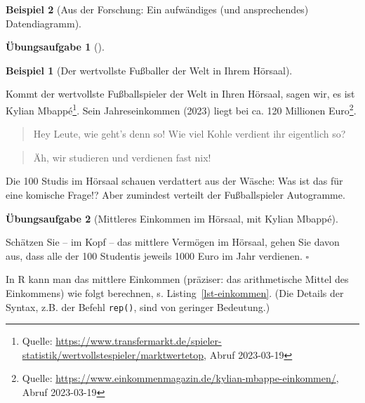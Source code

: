 \documentclass[
  a4paper,
]{scrbook}
\theoremstyle{definition}
\newtheorem{example}{Beispiel}[chapter]
\theoremstyle{definition}
\theoremstyle{definition}
\newtheorem{exercise}{Übungsaufgabe}[chapter]
\theoremstyle{remark}
\begin{document}
\begin{example}[Aus der Forschung: Ein aufwändiges (und ansprechendes)
Datendiagramm]
\begin{exercise}[]
\end{exercise}

\begin{example}[Der wertvollste Fußballer der Welt in Ihrem
Hörsaal]\protect\hypertarget{exm-md}{}\label{exm-md}

Kommt der wertvollste Fußballspieler der Welt in Ihren Hörsaal, sagen
wir, es ist Kylian Mbappé\footnote{Quelle:
  \url{https://www.transfermarkt.de/spieler-statistik/wertvollstespieler/marktwertetop},
  Abruf 2023-03-19}. Sein Jahreseinkommen (2023) liegt bei ca. 120
Millionen Euro\footnote{Quelle:
  \url{https://www.einkommenmagazin.de/kylian-mbappe-einkommen/}, Abruf
  2023-03-19}.

\begin{quote}
{} Hey Leute, wie geht's denn so! Wie viel Kohle
verdient ihr eigentlich so?
\end{quote}

\begin{quote}
{} Äh, wir studieren und verdienen fast nix!
\end{quote}

Die 100 Studis im Hörsaal schauen verdattert aus der Wäsche: Was ist das
für eine komische Frage!? Aber zumindest verteilt der Fußballspieler
Autogramme.

\end{example}

\begin{exercise}[Mittleres Einkommen im Hörsaal, mit Kylian
Mbappé]\protect\hypertarget{exr-elon}{}\label{exr-elon}

Schätzen Sie -- im Kopf -- das mittlere Vermögen im Hörsaal, gehen Sie
davon aus, dass alle der 100 Studentis jeweils 1000 Euro im Jahr
verdienen. \(\square\)

\end{exercise}

In R kann man das mittlere Einkommen (präziser: das arithmetische Mittel
des Einkommens) wie folgt berechnen, s. Listing~\ref{lst-einkommen}.
(Die Details der Syntax, z.B. der Befehl \texttt{rep()}, sind von
geringer Bedeutung.)

\begin{codelisting}

\caption{\label{lst-einkommen}Wir simulieren Einkommen von 100 Studis
plus Mbappé.}

\centering{

}
\end{codelisting}
\end{example}
\end{document}
